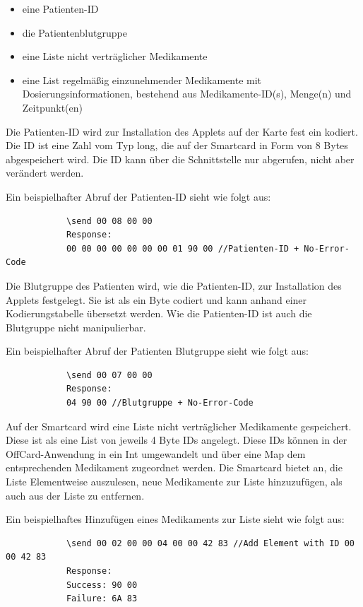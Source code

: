\documentclass[parskip]{scrartcl}
\begin{document}
		\begin{itemize}
			\item eine Patienten-ID
			\item die Patientenblutgruppe
			\item eine Liste nicht verträglicher Medikamente
			\item eine List regelmäßig einzunehmender Medikamente mit Dosierungsinformationen, bestehend aus Medikamente-ID(s), Menge(n) und Zeitpunkt(en)
		\end{itemize}
		
		Die Patienten-ID wird zur Installation des Applets auf der Karte fest ein kodiert. Die ID ist eine Zahl vom Typ long, die auf der Smartcard in Form von 8 Bytes abgespeichert wird. Die ID kann über die Schnittstelle nur abgerufen, nicht aber verändert werden.
		
		Ein beispielhafter Abruf der Patienten-ID sieht wie folgt aus:
		
		\begin{lstlisting}
			\send 00 08 00 00
			Response:
			00 00 00 00 00 00 00 01 90 00 //Patienten-ID + No-Error-Code
		\end{lstlisting}
		
		Die Blutgruppe des Patienten wird, wie die Patienten-ID, zur Installation des Applets festgelegt. Sie ist als ein Byte codiert und kann anhand einer Kodierungstabelle übersetzt werden. Wie die Patienten-ID ist auch die Blutgruppe nicht manipulierbar.
		
		Ein beispielhafter Abruf der Patienten Blutgruppe sieht wie folgt aus:
		
		\begin{lstlisting}
			\send 00 07 00 00
			Response:
			04 90 00 //Blutgruppe + No-Error-Code
		\end{lstlisting}
		
		Auf der Smartcard wird eine Liste nicht verträglicher Medikamente gespeichert. Diese ist als eine List von jeweils 4 Byte IDs angelegt. Diese IDs können in der OffCard-Anwendung in ein Int umgewandelt und über eine Map dem entsprechenden Medikament zugeordnet werden. Die Smartcard bietet an, die Liste Elementweise auszulesen, neue Medikamente zur Liste hinzuzufügen, als auch aus der Liste zu entfernen.
		
		Ein beispielhaftes Hinzufügen eines Medikaments zur Liste sieht wie folgt aus:
		
		\begin{lstlisting}
			\send 00 02 00 00 04 00 00 42 83 //Add Element with ID 00 00 42 83
			Response:
			Success: 90 00
			Failure: 6A 83
		\end{lstlisting}
		
\end{document}
